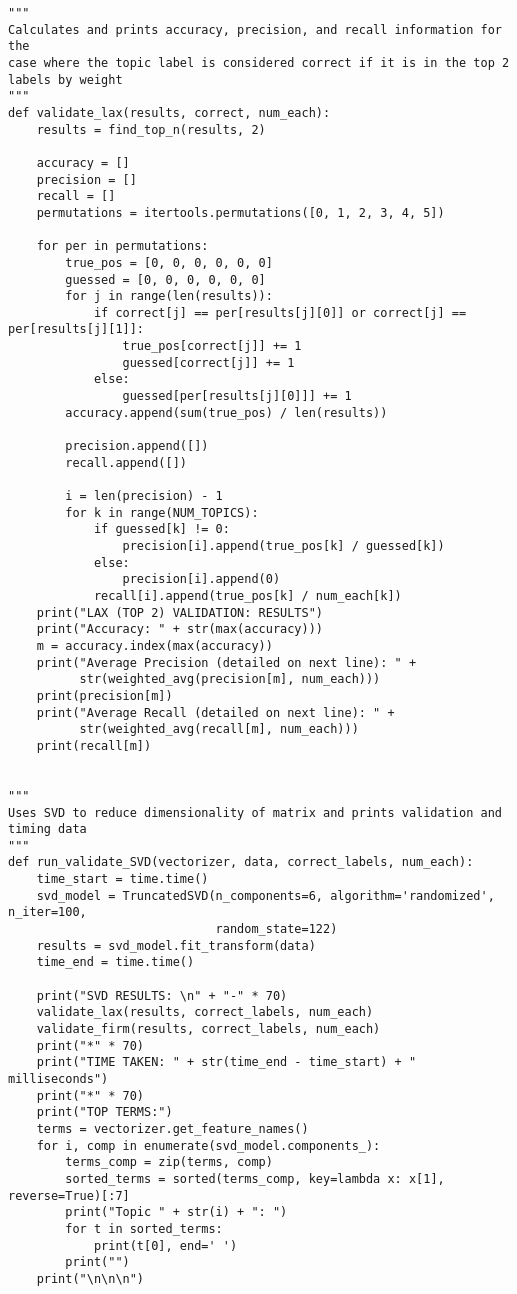 \documentclass{article}
\begin{document}
\begin{verbatim}
"""
Calculates and prints accuracy, precision, and recall information for the 
case where the topic label is considered correct if it is in the top 2 
labels by weight
"""
def validate_lax(results, correct, num_each):
    results = find_top_n(results, 2)

    accuracy = []
    precision = []
    recall = []
    permutations = itertools.permutations([0, 1, 2, 3, 4, 5])

    for per in permutations:
        true_pos = [0, 0, 0, 0, 0, 0]
        guessed = [0, 0, 0, 0, 0, 0]
        for j in range(len(results)):
            if correct[j] == per[results[j][0]] or correct[j] == per[results[j][1]]:
                true_pos[correct[j]] += 1
                guessed[correct[j]] += 1
            else:
                guessed[per[results[j][0]]] += 1
        accuracy.append(sum(true_pos) / len(results))

        precision.append([])
        recall.append([])

        i = len(precision) - 1
        for k in range(NUM_TOPICS):
            if guessed[k] != 0:
                precision[i].append(true_pos[k] / guessed[k])
            else:
                precision[i].append(0)
            recall[i].append(true_pos[k] / num_each[k])
    print("LAX (TOP 2) VALIDATION: RESULTS")
    print("Accuracy: " + str(max(accuracy)))
    m = accuracy.index(max(accuracy))
    print("Average Precision (detailed on next line): " +
          str(weighted_avg(precision[m], num_each)))
    print(precision[m])
    print("Average Recall (detailed on next line): " +
          str(weighted_avg(recall[m], num_each)))
    print(recall[m])


"""
Uses SVD to reduce dimensionality of matrix and prints validation and timing data
"""
def run_validate_SVD(vectorizer, data, correct_labels, num_each):
    time_start = time.time()
    svd_model = TruncatedSVD(n_components=6, algorithm='randomized', n_iter=100,
                             random_state=122)
    results = svd_model.fit_transform(data)
    time_end = time.time()

    print("SVD RESULTS: \n" + "-" * 70)
    validate_lax(results, correct_labels, num_each)
    validate_firm(results, correct_labels, num_each)
    print("*" * 70)
    print("TIME TAKEN: " + str(time_end - time_start) + " milliseconds")
    print("*" * 70)
    print("TOP TERMS:")
    terms = vectorizer.get_feature_names()
    for i, comp in enumerate(svd_model.components_):
        terms_comp = zip(terms, comp)
        sorted_terms = sorted(terms_comp, key=lambda x: x[1], reverse=True)[:7]
        print("Topic " + str(i) + ": ")
        for t in sorted_terms:
            print(t[0], end=' ')
        print("")
    print("\n\n\n")



\end{verbatim}
\end{document}
